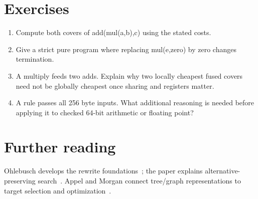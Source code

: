 \section{Exercises}
\label{sec:ch88-exercises}
\begin{enumerate}
\item\label{ex:ch88-cover} Compute both covers of add(mul(a,b),c) using the stated costs.
\item\label{ex:ch88-diverge} Give a strict pure program where replacing mul(e,zero) by zero changes termination.
\item\label{ex:ch88-dag} A multiply feeds two adds.
Explain why two locally cheapest fused covers need not be globally cheapest once sharing and registers matter.
\item\label{ex:ch88-proof} A rule passes all 256 byte inputs.
What additional reasoning is needed before applying it to checked 64-bit arithmetic or floating point?
\end{enumerate}

\section{Further reading}
\label{sec:ch88-reading}
Ohlebusch develops the rewrite foundations~\cite{ohlebusch-2002-rewriting}; the  paper explains alternative-preserving search~\cite{willsey-2021-egg}.
Appel and Morgan connect tree/graph representations to target selection and optimization~\cite{appel-1998-modern,morgan-1998-optimizing}.
